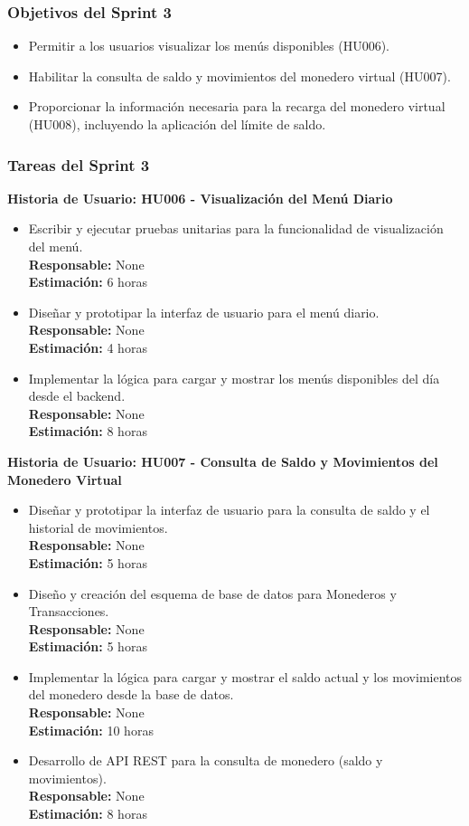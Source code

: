 \documentclass[12pt]{article}
\begin{document}
\subsubsection{Objetivos del Sprint 3}
\begin{itemize}
	\item Permitir a los usuarios visualizar los menús disponibles (HU006).
	\item Habilitar la consulta de saldo y movimientos del monedero virtual (HU007).
	\item Proporcionar la información necesaria para la recarga del monedero virtual (HU008), incluyendo la aplicación del límite de saldo.
\end{itemize}

\subsubsection{Tareas del Sprint 3}
\textbf{Historia de Usuario: HU006 - Visualización del Menú Diario}
\begin{itemize}
	\item Escribir y ejecutar pruebas unitarias para la funcionalidad de visualización del menú. \\
	\textbf{Responsable:} None \\
	\textbf{Estimación:} 6 horas
	\item Diseñar y prototipar la interfaz de usuario para el menú diario. \\
	\textbf{Responsable:} None \\
	\textbf{Estimación:} 4 horas
	\item Implementar la lógica para cargar y mostrar los menús disponibles del día desde el backend. \\
	\textbf{Responsable:} None \\
	\textbf{Estimación:} 8 horas
\end{itemize}

\textbf{Historia de Usuario: HU007 - Consulta de Saldo y Movimientos del Monedero Virtual}
\begin{itemize}
	\item Diseñar y prototipar la interfaz de usuario para la consulta de saldo y el historial de movimientos. \\
	\textbf{Responsable:} None \\
	\textbf{Estimación:} 5 horas
	\item Diseño y creación del esquema de base de datos para Monederos y Transacciones. \\
	\textbf{Responsable:} None \\
	\textbf{Estimación:} 5 horas
	\item Implementar la lógica para cargar y mostrar el saldo actual y los movimientos del monedero desde la base de datos. \\
	\textbf{Responsable:} None \\
	\textbf{Estimación:} 10 horas
	\item Desarrollo de API REST para la consulta de monedero (saldo y movimientos). \\
	\textbf{Responsable:} None \\
	\textbf{Estimación:} 8 horas
\end{itemize}
\end{document}
